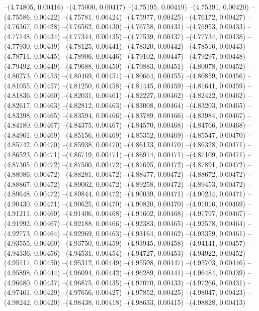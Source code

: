 --(4.74805, 0.00416)
--(4.75000, 0.00417)
--(4.75195, 0.00419)
--(4.75391, 0.00420)
--(4.75586, 0.00422)
--(4.75781, 0.00424)
--(4.75977, 0.00425)
--(4.76172, 0.00427)
--(4.76367, 0.00428)
--(4.76562, 0.00430)
--(4.76758, 0.00431)
--(4.76953, 0.00433)
--(4.77148, 0.00434)
--(4.77344, 0.00435)
--(4.77539, 0.00437)
--(4.77734, 0.00438)
--(4.77930, 0.00439)
--(4.78125, 0.00441)
--(4.78320, 0.00442)
--(4.78516, 0.00443)
--(4.78711, 0.00445)
--(4.78906, 0.00446)
--(4.79102, 0.00447)
--(4.79297, 0.00448)
--(4.79492, 0.00449)
--(4.79688, 0.00450)
--(4.79883, 0.00451)
--(4.80078, 0.00452)
--(4.80273, 0.00453)
--(4.80469, 0.00454)
--(4.80664, 0.00455)
--(4.80859, 0.00456)
--(4.81055, 0.00457)
--(4.81250, 0.00458)
--(4.81445, 0.00459)
--(4.81641, 0.00459)
--(4.81836, 0.00460)
--(4.82031, 0.00461)
--(4.82227, 0.00462)
--(4.82422, 0.00462)
--(4.82617, 0.00463)
--(4.82812, 0.00463)
--(4.83008, 0.00464)
--(4.83203, 0.00465)
--(4.83398, 0.00465)
--(4.83594, 0.00466)
--(4.83789, 0.00466)
--(4.83984, 0.00467)
--(4.84180, 0.00467)
--(4.84375, 0.00467)
--(4.84570, 0.00468)
--(4.84766, 0.00468)
--(4.84961, 0.00469)
--(4.85156, 0.00469)
--(4.85352, 0.00469)
--(4.85547, 0.00470)
--(4.85742, 0.00470)
--(4.85938, 0.00470)
--(4.86133, 0.00470)
--(4.86328, 0.00471)
--(4.86523, 0.00471)
--(4.86719, 0.00471)
--(4.86914, 0.00471)
--(4.87109, 0.00471)
--(4.87305, 0.00472)
--(4.87500, 0.00472)
--(4.87695, 0.00472)
--(4.87891, 0.00472)
--(4.88086, 0.00472)
--(4.88281, 0.00472)
--(4.88477, 0.00472)
--(4.88672, 0.00472)
--(4.88867, 0.00472)
--(4.89062, 0.00472)
--(4.89258, 0.00472)
--(4.89453, 0.00472)
--(4.89648, 0.00472)
--(4.89844, 0.00472)
--(4.90039, 0.00471)
--(4.90234, 0.00471)
--(4.90430, 0.00471)
--(4.90625, 0.00470)
--(4.90820, 0.00470)
--(4.91016, 0.00469)
--(4.91211, 0.00469)
--(4.91406, 0.00468)
--(4.91602, 0.00468)
--(4.91797, 0.00467)
--(4.91992, 0.00467)
--(4.92188, 0.00466)
--(4.92383, 0.00465)
--(4.92578, 0.00464)
--(4.92773, 0.00464)
--(4.92969, 0.00463)
--(4.93164, 0.00462)
--(4.93359, 0.00461)
--(4.93555, 0.00460)
--(4.93750, 0.00459)
--(4.93945, 0.00458)
--(4.94141, 0.00457)
--(4.94336, 0.00456)
--(4.94531, 0.00454)
--(4.94727, 0.00453)
--(4.94922, 0.00452)
--(4.95117, 0.00450)
--(4.95312, 0.00449)
--(4.95508, 0.00447)
--(4.95703, 0.00446)
--(4.95898, 0.00444)
--(4.96094, 0.00442)
--(4.96289, 0.00441)
--(4.96484, 0.00439)
--(4.96680, 0.00437)
--(4.96875, 0.00435)
--(4.97070, 0.00433)
--(4.97266, 0.00431)
--(4.97461, 0.00429)
--(4.97656, 0.00427)
--(4.97852, 0.00425)
--(4.98047, 0.00423)
--(4.98242, 0.00420)
--(4.98438, 0.00418)
--(4.98633, 0.00415)
--(4.98828, 0.00413)
